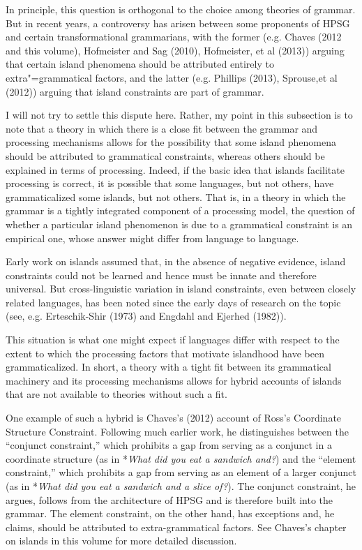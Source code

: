 \documentclass[a4paper]{article}
\begin{document}
In principle, this question is orthogonal to the choice among theories of grammar.  But in recent years, a controversy has arisen between some proponents of HPSG and certain transformational grammarians, with the former (e.g. Chaves (2012 and this volume), Hofmeister and Sag (2010), Hofmeister, et al (2013)) arguing that certain island phenomena should be attributed entirely to extra"=grammatical factors, and the latter (e.g. Phillips (2013), Sprouse,et al (2012)) arguing that island constraints are part of grammar.

I will not try to settle this dispute here.  Rather, my point in this subsection is to note that a theory in which there is a close fit between the grammar and processing mechanisms allows for the possibility that some island phenomena should be attributed to grammatical constraints, whereas others should be explained in terms of processing.  Indeed, if the basic idea that islands facilitate processing is correct, it is possible that some languages, but not others, have grammaticalized some islands, but not others.  That is, in a theory in which the grammar is a tightly integrated component of a processing model, the question of whether a particular island phenomenon is due to a grammatical constraint is an empirical one, whose answer might differ from language to language. 

Early work on islands assumed that, in the absence of negative evidence, island constraints could not be learned and hence must be innate and therefore universal.  But cross-linguistic variation in island constraints, even between closely related languages, has been noted since the early days of research on the topic (see, e.g. Erteschik-Shir (1973) and Engdahl and Ejerhed (1982)).

This situation is what one might expect if languages differ with respect to the extent to which the processing factors that motivate islandhood have been grammaticalized.  In short, a theory with a tight fit between its grammatical machinery and its processing mechanisms allows for hybrid accounts of islands that are not available to theories without such a fit.

One example of such a hybrid is Chaves's (2012) account of Ross's Coordinate Structure Constraint.  Following much earlier work, he distinguishes between the ``conjunct constraint,'' which prohibits a gap from serving as a conjunct in a coordinate structure (as in *{\it What did you eat a sandwich and?}) and the ``element constraint,'' which prohibits a gap from serving as an element of a larger conjunct (as in *{\it What did you eat a sandwich and a slice of?}).  The conjunct constraint, he argues, follows from the architecture of HPSG and is therefore built into the grammar.  The element constraint, on the other hand, has exceptions and, he claims, should be attributed to extra-grammatical factors.  See Chaves's chapter on islands in this volume for more detailed discussion. 
\end{document}
